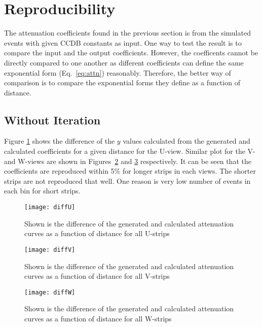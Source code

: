 \section{Reproducibility}
The attenuation coefficients found in the previous section is from the simulated events with given CCDB constants as input.
One way to test the result is to compare the input and the output coefficients. However, the coefficents cannot be directly
compared to one another as different coefficients can define the same exponential form (Eq.~\ref{eq:attn}) reasonably. Therefore, 
the better way of comparison is to compare the exponential forms they define as a function of distance.

\FloatBarrier
\subsection{Without Iteration}
Figure \ref{fig:compGenCalcU} shows the difference of the $y$ values calculated from the generated and calculated coefficients
for a given distance for the U-view. Similar plot for the V- and W-views are shown in Figures~\ref{fig:compGenCalcV} and 
\ref{fig:compGenCalcW} respectively. It can be seen that the coefficients are reproduced within 5\% for longer strips
in each views. The shorter strips are not reproduced that well. One reason is very low number of events in each bin for
short strips.

\begin{figure}[h]
\centering
\texttt{[image: diffU]}
\caption{Shown is the difference of the generated and calculated attenuation curves as a function of distance for all U-strips}
\label{fig:compGenCalcU}
\end{figure}

\begin{figure}[h]
\centering
\texttt{[image: diffV]}
\caption{Shown is the difference of the generated and calculated attenuation curves as a function of distance for all V-strips}
\label{fig:compGenCalcV}
\end{figure}

\begin{figure}[h]
\centering
\texttt{[image: diffW]}
\caption{Shown is the difference of the generated and calculated attenuation curves as a function of distance for all W-strips}
\label{fig:compGenCalcW}
\end{figure}
\FloatBarrier

\FloatBarrier
